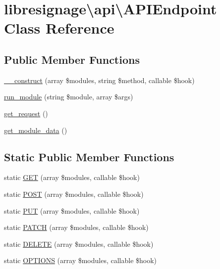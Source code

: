 \hypertarget{classlibresignage_1_1api_1_1APIEndpoint}{}\section{libresignage\textbackslash{}api\textbackslash{}A\+P\+I\+Endpoint Class Reference}
\label{classlibresignage_1_1api_1_1APIEndpoint}
\subsection*{Public Member Functions}
\begin{DoxyCompactItemize}
\item 
\hyperlink{classlibresignage_1_1api_1_1APIEndpoint_a4d3551a76b6477f65f7c3187be211cb3}{\+\_\+\+\_\+construct} (array \$modules, string \$method, callable \$hook)
\item 
\hyperlink{classlibresignage_1_1api_1_1APIEndpoint_ae6d4871172a7ebd0e9d74540b1a21525}{run\+\_\+module} (string \$module, array \$args)
\item 
\hyperlink{classlibresignage_1_1api_1_1APIEndpoint_af6989459d2aa54f417a4a44c13747125}{get\+\_\+request} ()
\item 
\hyperlink{classlibresignage_1_1api_1_1APIEndpoint_aab882ae441f1aeecdf03ed619533dabf}{get\+\_\+module\+\_\+data} ()
\end{DoxyCompactItemize}
\subsection*{Static Public Member Functions}
\begin{DoxyCompactItemize}
\item 
static \hyperlink{classlibresignage_1_1api_1_1APIEndpoint_ad8fc668e94f2ad8ef6e223e2752e2bd3}{G\+ET} (array \$modules, callable \$hook)
\item 
static \hyperlink{classlibresignage_1_1api_1_1APIEndpoint_a82763ffe46183716a1fc6bdb28599539}{P\+O\+ST} (array \$modules, callable \$hook)
\item 
static \hyperlink{classlibresignage_1_1api_1_1APIEndpoint_a2964043ac81d67c7f8009ffe3c23eac4}{P\+UT} (array \$modules, callable \$hook)
\item 
static \hyperlink{classlibresignage_1_1api_1_1APIEndpoint_a25047a0cb7abd12254382ad8c217d80e}{P\+A\+T\+CH} (array \$modules, callable \$hook)
\item 
static \hyperlink{classlibresignage_1_1api_1_1APIEndpoint_af6f6859ae46ce52b1801213f6fab41f6}{D\+E\+L\+E\+TE} (array \$modules, callable \$hook)
\item 
static \hyperlink{classlibresignage_1_1api_1_1APIEndpoint_ad75a51aeb94c50be8f17d7867ceaa6a2}{O\+P\+T\+I\+O\+NS} (array \$modules, callable \$hook)
\end{DoxyCompactItemize}
